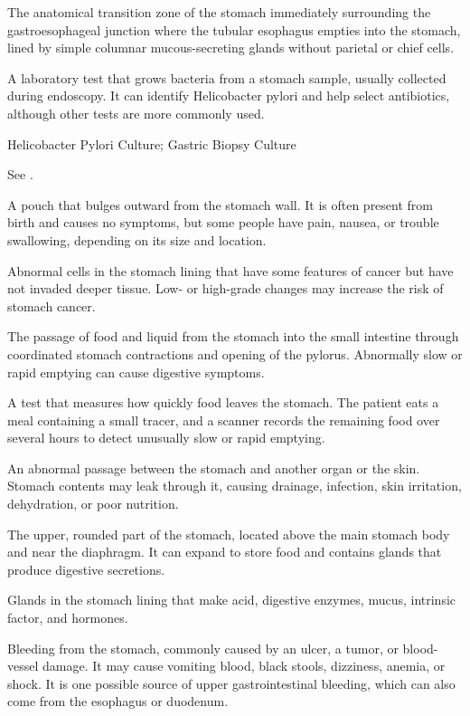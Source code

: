  The anatomical transition zone of the stomach immediately surrounding the gastroesophageal junction where the tubular esophagus empties into the stomach, lined by simple columnar mucous-secreting glands without parietal or chief cells.

 A laboratory test that grows bacteria from a stomach sample, usually collected during endoscopy. It can identify Helicobacter pylori and help select antibiotics, although other tests are more commonly used.

\synonyms
Helicobacter Pylori Culture; Gastric Biopsy Culture

 See .

 A pouch that bulges outward from the stomach wall. It is often present from birth and causes no symptoms, but some people have pain, nausea, or trouble swallowing, depending on its size and location.

 Abnormal cells in the stomach lining that have some features of cancer but have not invaded deeper tissue. Low- or high-grade changes may increase the risk of stomach cancer.

 The passage of food and liquid from the stomach into the small intestine through coordinated stomach contractions and opening of the pylorus. Abnormally slow or rapid emptying can cause digestive symptoms.

 A test that measures how quickly food leaves the stomach. The patient eats a meal containing a small tracer, and a scanner records the remaining food over several hours to detect unusually slow or rapid emptying.

 An abnormal passage between the stomach and another organ or the skin. Stomach contents may leak through it, causing drainage, infection, skin irritation, dehydration, or poor nutrition.

 The upper, rounded part of the stomach, located above the main stomach body and near the diaphragm. It can expand to store food and contains glands that produce digestive secretions.

 Glands in the stomach lining that make acid, digestive enzymes, mucus, intrinsic factor, and hormones.

 Bleeding from the stomach, commonly caused by an ulcer, a tumor, or blood-vessel damage. It may cause vomiting blood, black stools, dizziness, anemia, or shock. It is one possible source of upper gastrointestinal bleeding, which can also come from the esophagus or duodenum.

